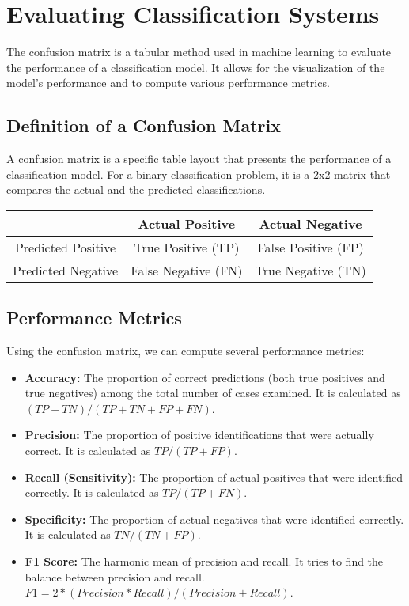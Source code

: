 \chapter{Evaluating Classification Systems}

The confusion matrix is a tabular method used in machine learning to
evaluate the performance of a classification model. It allows for the
visualization of the model's performance and to compute various
performance metrics.

\section{Definition of a Confusion Matrix}

A confusion matrix is a specific table layout that presents the
performance of a classification model. For a binary classification
problem, it is a 2x2 matrix that compares the actual and the predicted
classifications.

\begin{table}[h]
\centering
\begin{tabular}{|c|c|c|}
\hline
 & Actual Positive & Actual Negative \\
\hline
Predicted Positive & True Positive (TP) & False Positive (FP) \\
\hline
Predicted Negative & False Negative (FN) & True Negative (TN) \\
\hline
\end{tabular}
\end{table}

\section{Performance Metrics}

Using the confusion matrix, we can compute several performance metrics:

\begin{itemize}
\item \textbf{Accuracy:} The proportion of correct predictions (both
  true positives and true negatives) among the total number of cases
  examined. It is calculated as $(TP + TN) / (TP + TN + FP + FN)$.

\item \textbf{Precision:} The proportion of positive identifications
  that were actually correct. It is calculated as $TP / (TP + FP)$.

\item \textbf{Recall (Sensitivity):} The proportion of actual
  positives that were identified correctly. It is calculated as $TP /
  (TP + FN)$.

\item \textbf{Specificity:} The proportion of actual negatives that
  were identified correctly. It is calculated as $TN / (TN + FP)$.

\item \textbf{F1 Score:} The harmonic mean of precision and recall. It
  tries to find the balance between precision and recall. $F1 = 2 *
  (Precision * Recall) / (Precision + Recall)$.
\end{itemize}

\
